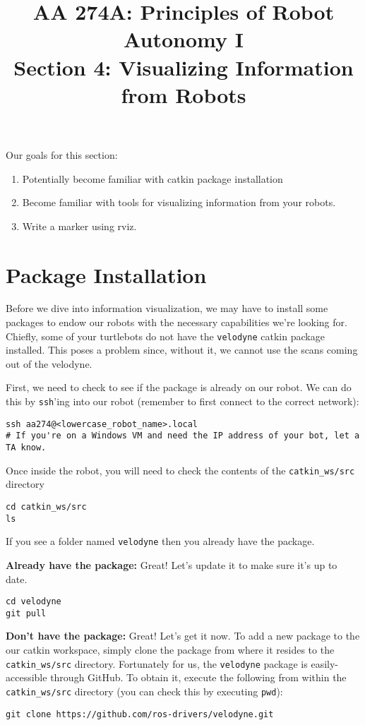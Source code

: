 \documentclass{article}
\title{AA 274A: Principles of Robot Autonomy I \\ Section 4: Visualizing Information from Robots}
\date{}
\begin{document}
\maketitle
\pagestyle{fancy}

Our goals for this section: \begin{enumerate}
	\item Potentially become familiar with catkin package installation
    \item Become familiar with tools for visualizing information from your robots.
    \item Write a marker using rviz.
\end{enumerate}

\section{Package Installation}

Before we dive into information visualization, we may have to install some packages to endow our robots with the necessary capabilities we're looking for. Chiefly, some of your turtlebots do not have the \texttt{velodyne} catkin package installed. This poses a problem since, without it, we cannot use the scans coming out of the velodyne.

First, we need to check to see if the package is already on our robot. We can do this by \texttt{ssh}'ing into our robot (remember to first connect to the correct network):
\begin{lstlisting}
ssh aa274@<lowercase_robot_name>.local
# If you're on a Windows VM and need the IP address of your bot, let a TA know.
\end{lstlisting}

Once inside the robot, you will need to check the contents of the \texttt{catkin\_ws/src} directory
\begin{lstlisting}
cd catkin_ws/src
ls
\end{lstlisting}
If you see a folder named \texttt{velodyne} then you already have the package.

{\bf Already have the package:} Great! Let's update it to make sure it's up to date.
\begin{lstlisting}
cd velodyne
git pull
\end{lstlisting}

{\bf Don't have the package:} Great! Let's get it now. To add a new package to the our catkin workspace, simply clone the package from where it resides to the \texttt{catkin\_ws/src} directory. Fortunately for us, the \texttt{velodyne} package is easily-accessible through GitHub. To obtain it, execute the following from within the \texttt{catkin\_ws/src} directory (you can check this by executing \texttt{pwd}):
\begin{lstlisting}
git clone https://github.com/ros-drivers/velodyne.git
\end{lstlisting}
\end{document}
